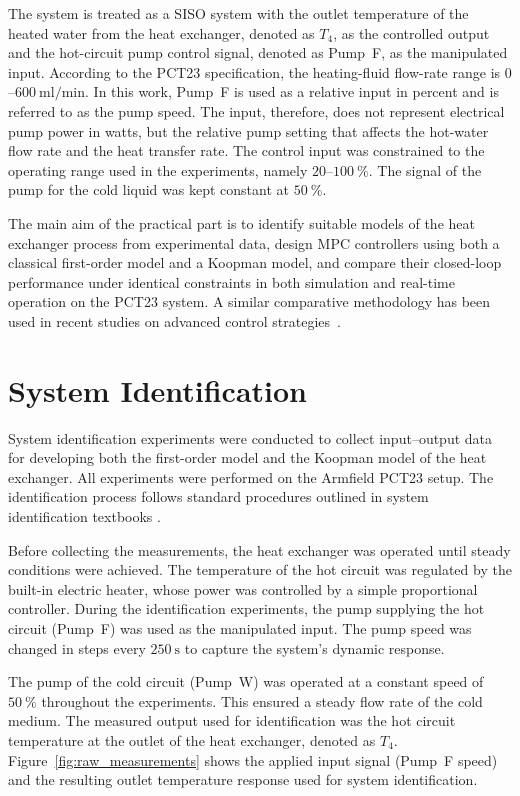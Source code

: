 The system is treated as a SISO system with the outlet temperature of the heated water from the heat exchanger, denoted as $T_4$, as the controlled output and the hot-circuit pump control signal, denoted as Pump~F, as the manipulated input. According to the PCT23 specification, the heating-fluid flow-rate range is $0$--$600~\mathrm{ml/min}$. In this work, Pump~F is used as a relative input in percent and is referred to as the pump speed. The input, therefore, does not represent electrical pump power in watts, but the relative pump setting that affects the hot-water flow rate and the heat transfer rate. The control input was constrained to the operating range used in the experiments, namely $20$--$100~\%$. The signal of the pump for the cold liquid was kept constant at $50~\%$.

The main aim of the practical part is to identify suitable models of the heat exchanger process from experimental data, design MPC controllers using both a classical first-order model and a Koopman model, and compare their closed-loop performance under identical constraints in both simulation and real-time operation on the PCT23 system. A similar comparative methodology has been used in recent studies on advanced control strategies~\cite{bieker2020deep,rodriguez2021latest}.



\section{System Identification}

System identification experiments were conducted to collect input–output data for developing both the first-order model and the Koopman model of the heat exchanger. All experiments were performed on the Armfield PCT23 setup. The identification process follows standard procedures outlined in system identification textbooks \cite{morari1999}.

Before collecting the measurements, the heat exchanger was operated until steady conditions were achieved. The temperature of the hot circuit was regulated by the built-in electric heater, whose power was controlled by a simple proportional controller. 
During the identification experiments, the pump supplying the hot circuit (Pump~F) was used as the manipulated input. The pump speed was changed in steps every $250~\mathrm{s}$ to capture the system's dynamic response.

The pump of the cold circuit (Pump~W) was operated at a constant speed of $50~\%$ throughout the experiments. This ensured a steady flow rate of the cold medium.
The measured output used for identification was the hot circuit temperature at the outlet of the heat exchanger, denoted as $T_4$. Figure~\ref{fig:raw_measurements} shows the applied input signal (Pump~F speed) and the resulting outlet temperature response used for system identification.

